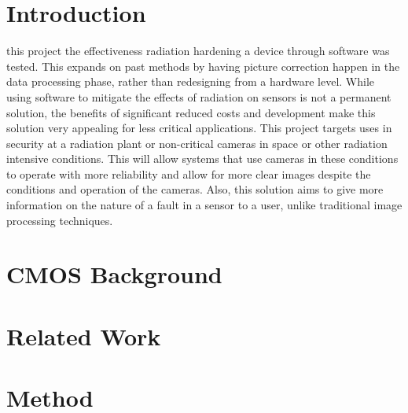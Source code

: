 \documentclass[journal]{IEEEtran}
\begin{document}
\section{Introduction}%
 this project the effectiveness radiation hardening a device through software was tested.  This expands on past methods by having picture correction happen in the data processing phase, rather than redesigning from a hardware level. While using software to mitigate the effects of radiation on sensors is not a permanent solution, the benefits of significant reduced costs and development make this solution very appealing for less critical applications. This project targets uses in security at a radiation plant or non-critical cameras in space or other radiation intensive conditions. This will allow systems that use cameras in these conditions to operate with more reliability and allow for more clear images despite the conditions and operation of the cameras.  Also, this solution aims to give more information on the nature of a fault in a sensor to a user, unlike traditional image processing techniques.

\section{CMOS Background}


\section{Related Work} 


\section{Method}



{\footnotesize

}
\end{document}
